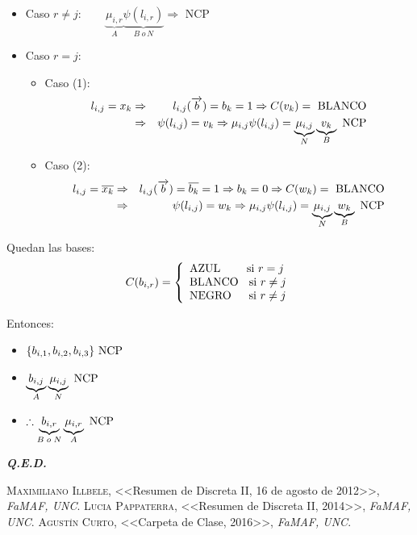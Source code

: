 \documentclass[12pt,a4paper]{report}
\newcounter{neq}
\newcommand{\QED}{\hfill \textit{\textbf{Q.E.D.}}}
\begin{document}
				\begin{itemize}
					\item Caso $r \neq j : \qquad \underbrace{\mu_{i, r}}_{A} \underbrace{\psi(l_{i, r})}_{B \; o \, N} \Rightarrow$ NCP
					\item Caso $r = j$:
						\begin{itemize}
							\item Caso (1):
								\begin{eqnarray}
									\nonumber l_{i, j} = x_{k} &\Rightarrow & l_{i, j}(\overrightarrow{b}) = b_{k} = 1 \Rightarrow C(v_{k}) = \textup{ BLANCO} \\
									\nonumber &\Rightarrow& \psi(l_{i, j}) = v_{k}	\Rightarrow \mu_{i, j} \psi(l_{i, j}) = \underbrace{\mu_{i, j}}_{N} \underbrace{v_{k}}_{B} \textup{ NCP}
								\end{eqnarray}

							\item Caso (2):
								\begin{eqnarray}
										\nonumber l_{i, j} = \overline{x_{k}} &\Rightarrow & l_{i, j}(\overrightarrow{b}) = \overline{b_{k}} = 1 \Rightarrow b_{k} = 0 \Rightarrow C(w_{k}) = \textup{ BLANCO} \\
										\nonumber &\Rightarrow& \psi(l_{i, j}) = w_{k}	\Rightarrow \mu_{i, j} \psi(l_{i, j}) = \underbrace{\mu_{i, j}}_{N} \underbrace{w_{k}}_{B} \textup{ NCP}
								\end{eqnarray}
						\end{itemize}
				\end{itemize}

				\par Quedan las bases:
				\begin{equation*}
					C(b_{i, r}) =
				  \left\lbrace
		  		\begin{array}{l}
		    		\textup{AZUL \qquad si } r = j \\
		    		\textup{BLANCO \; si } r \neq j \\
		    		\textup{NEGRO \; \; si } r \neq j
		  		\end{array}
		 			\right.
				\end{equation*}

				\par Entonces:
				\begin{itemize}
					\item $\lbrace b_{i, 1}, b_{i, 2}, b_{i, 3} \rbrace \textup{ NCP}$
			 		\item $\underbrace{b_{i, j}}_{A} \underbrace{\mu_{i, j}}_{N} \textup{ NCP}$
			 		\item $\therefore \underbrace{b_{i, r}}_{B \; o \; N} \underbrace{\mu_{i, r}}_{A} \textup{ NCP}$
				\end{itemize}

		\QED


\begin{thebibliography}{X}
 \textsc{Maximiliano Illbele},
<<Resumen de Discreta II, 16 de agosto de 2012>>,
\textit{FaMAF, UNC}.
 \textsc{Lucia Pappaterra},
<<Resumen de Discreta II, 2014>>,
\textit{FaMAF, UNC}.
 \textsc{Agustín Curto},
<<Carpeta de Clase, 2016>>,
\textit{FaMAF, UNC}.
\end{thebibliography}
\end{document}
